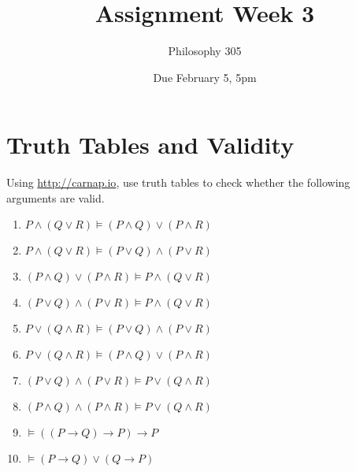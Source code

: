 \documentclass[
  11pt,
]{article}
\title{Assignment Week 3}
\author{Philosophy 305}
\date{Due February 5, 5pm}
\providecommand{\tightlist}{%
  \setlength{\itemsep}{0pt}\setlength{\parskip}{0pt}}
\begin{document}
\maketitle

\hypertarget{truth-tables-and-validity}{%
\section{Truth Tables and Validity}\label{truth-tables-and-validity}}

Using \url{http://carnap.io}, use truth tables to check whether the
following arguments are valid.

\begin{enumerate}
\def\labelenumi{\arabic{enumi}.}
\tightlist
\item
  \(P \wedge (Q \vee R) \vDash (P \wedge Q) \vee (P \wedge R)\)
\item
  \(P \wedge (Q \vee R) \vDash (P \vee Q) \wedge (P \vee R)\)
\item
  \((P \wedge Q) \vee (P \wedge R) \vDash P \wedge (Q \vee R)\)
\item
  \((P \vee Q) \wedge (P \vee R) \vDash P \wedge (Q \vee R)\)
\item
  \(P \vee (Q \wedge R) \vDash (P \vee Q) \wedge (P \vee R)\)
\item
  \(P \vee (Q \wedge R) \vDash (P \wedge Q) \vee (P \wedge R)\)
\item
  \((P \vee Q) \wedge (P \vee R) \vDash P \vee (Q \wedge R)\)
\item
  \((P \wedge Q) \wedge (P \wedge R) \vDash P \vee (Q \wedge R)\)
\item
  \(\vDash ((P \rightarrow Q) \rightarrow P) \rightarrow P\)
\item
  \(\vDash (P \rightarrow Q) \vee (Q \rightarrow P)\)
\end{enumerate}
\end{document}
